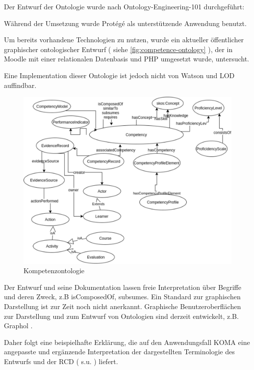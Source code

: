\documentclass[
12pt,
english,
ngerman,
headsepline,
twoside,
openright,
numbers=noenddot,version=first
]{scrreprt}
\begin{document}
Der Entwurf der Ontologie wurde nach Ontology-Engineering-101 durchgeführt:

Während der Umsetzung wurde Protégé \cite{Protégé} als unterstützende Anwendung benutzt.

Um bereits vorhandene Technologien zu nutzen,
wurde ein aktueller öffentlicher graphischer ontologischer Entwurf\cite{ontoMoodle} ( siehe \autoref{fig:competence-ontology} ), der in Moodle mit einer relationalen Datenbasis und PHP umgesetzt wurde, untersucht.

Eine Implementation dieser Ontologie ist jedoch nicht von Watson\cite{Watson} und LOD\cite{LOD} auffindbar.

\begin{figure}[h]
	\centering
	\includegraphics[angle=270]{pics/competency-ontology.eps}
	\caption{Kompetenzontologie}
	\label{fig:competence-ontology}
\end{figure}


Der Entwurf und seine Dokumentation lassen freie Interpretation über Begriffe und deren Zweck, z.B \glqq isComposedOf\grqq, \glqq subsumes\grqq. Ein Standard zur graphischen Darstellung ist zur Zeit noch nicht anerkannt. Graphische Benutzeroberflächen zur Darstellung und zum Entwurf von Ontologien sind derzeit entwickelt, z.B. Graphol \cite{graphol}.

Daher folgt eine beispielhafte Erklärung, die auf den Anwendungsfall \acrshort{KOMA} eine angepasste und ergänzende Interpretation der dargestellten Terminologie des Entwurfs und der \acrshort{RCD} ( s.u. ) liefert.
\end{document}
